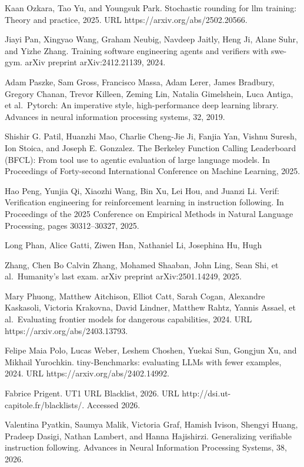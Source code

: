 \documentclass[
  10
]{article}
\begin{document}
Kaan Ozkara, Tao Yu, and Youngsuk Park. Stochastic rounding for llm
training: Theory and practice, 2025. URL
https://arxiv.org/abs/2502.20566.

Jiayi Pan, Xingyao Wang, Graham Neubig, Navdeep Jaitly, Heng Ji, Alane
Suhr, and Yizhe Zhang. Training software engineering agents and
verifiers with swe-gym. arXiv preprint arXiv:2412.21139, 2024.

Adam Paszke, Sam Gross, Francisco Massa, Adam Lerer, James Bradbury,
Gregory Chanan, Trevor Killeen, Zeming Lin, Natalia Gimelshein, Luca
Antiga, et al.~Pytorch: An imperative style, high-performance deep
learning library. Advances in neural information processing systems, 32,
2019.

Shishir G. Patil, Huanzhi Mao, Charlie Cheng-Jie Ji, Fanjia Yan, Vishnu
Suresh, Ion Stoica, and Joseph E. Gonzalez. The Berkeley Function
Calling Leaderboard (BFCL): From tool use to agentic evaluation of large
language models. In Proceedings of Forty-second International Conference
on Machine Learning, 2025.

Hao Peng, Yunjia Qi, Xiaozhi Wang, Bin Xu, Lei Hou, and Juanzi Li.
Verif: Verification engineering for reinforcement learning in
instruction following. In Proceedings of the 2025 Conference on Empirical
Methods in Natural Language Processing, pages 30312--30327, 2025.

Long Phan, Alice Gatti, Ziwen Han, Nathaniel Li, Josephina Hu, Hugh

Zhang, Chen Bo Calvin Zhang, Mohamed Shaaban, John Ling, Sean Shi, et
al.~Humanity's last exam. arXiv preprint arXiv:2501.14249, 2025.

Mary Phuong, Matthew Aitchison, Elliot Catt, Sarah Cogan, Alexandre
Kaskasoli, Victoria Krakovna, David Lindner, Matthew Rahtz, Yannis
Assael, et al.~Evaluating frontier models for dangerous capabilities,
2024. URL https://arxiv.org/abs/2403.13793.

Felipe Maia Polo, Lucas Weber, Leshem Choshen, Yuekai Sun, Gongjun Xu,
and Mikhail Yurochkin. tiny-Benchmarks: evaluating LLMs with fewer
examples, 2024. URL https://arxiv.org/abs/2402.14992.

Fabrice Prigent. UT1 URL Blacklist, 2026. URL
http://dsi.ut-capitole.fr/blacklists/. Accessed 2026.

Valentina Pyatkin, Saumya Malik, Victoria Graf, Hamish Ivison, Shengyi
Huang, Pradeep Dasigi, Nathan Lambert, and Hanna Hajishirzi.
Generalizing verifiable instruction following. Advances in Neural
Information Processing Systems, 38, 2026.
\end{document}
